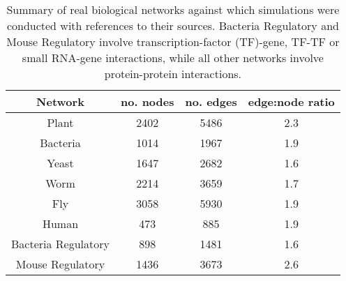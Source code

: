 \setlength{\textfloatsep}{0pt plus 1.0pt minus 1.0pt} %
	\begin{table}[t] %
		\scriptsize %
			\setlength\cellspacetoplimit{4pt} %
			\setlength\cellspacebottomlimit{4pt} %
			\begin{tabular}{c|c|c|c}  %
				\hline\hline
					\textbf{Network} & \textbf{no. nodes} & \textbf{no. edges}	& \textbf{edge:node ratio}
				\\[.05cm] \hline
					Plant \cite{consortium_evidence_2011}  & 2402 & 5486 & 2.3
				\\[.05cm] \hline
					Bacteria \cite{rajagopala_binary_2014} & 1014 & 1967 & 1.9
				\\[.05cm] \hline
					Yeast \cite{yu_high-quality_2008}      & 1647 & 2682 & 1.6
				\\[.05cm] \hline
					Worm \cite{simonis_empirically_2009}   & 2214 & 3659 & 1.7
				\\[.05cm] \hline
					Fly \cite{vinayagam_integrating_2014}  & 3058 & 5930 & 1.9
				\\[.05cm] \hline
					Human \cite{yang_widespread_2016}      & 473  & 885 & 1.9
				\\[.05cm] \hline
				    Bacteria Regulatory \cite{gama-castro_regulondb_2016} & 898 & 1481 & 1.6
				\\[.05cm] \hline
				    Mouse Regulatory \cite{liu_regnetwork:_2015} & 1436 & 3673 & 2.6
				\\[.05cm] \hline\hline
			\end{tabular}
			\caption{Summary of real biological networks against which simulations were conducted with references to their sources. Bacteria Regulatory and Mouse Regulatory
			 involve transcription-factor (TF)-gene, TF-TF or small RNA-gene interactions, while all other networks involve protein-protein interactions. 
			         }\label{networks_summary}	
	\end{table}
